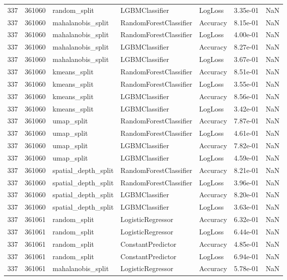 \begin{tabular}{rrlllrr}
337 & 361060 & random\_split & LGBMClassifier & LogLoss & 3.35e-01 & NaN \\
337 & 361060 & mahalanobis\_split & RandomForestClassifier & Accuracy & 8.15e-01 & NaN \\
337 & 361060 & mahalanobis\_split & RandomForestClassifier & LogLoss & 4.00e-01 & NaN \\
337 & 361060 & mahalanobis\_split & LGBMClassifier & Accuracy & 8.27e-01 & NaN \\
337 & 361060 & mahalanobis\_split & LGBMClassifier & LogLoss & 3.67e-01 & NaN \\
337 & 361060 & kmeans\_split & RandomForestClassifier & Accuracy & 8.51e-01 & NaN \\
337 & 361060 & kmeans\_split & RandomForestClassifier & LogLoss & 3.55e-01 & NaN \\
337 & 361060 & kmeans\_split & LGBMClassifier & Accuracy & 8.56e-01 & NaN \\
337 & 361060 & kmeans\_split & LGBMClassifier & LogLoss & 3.42e-01 & NaN \\
337 & 361060 & umap\_split & RandomForestClassifier & Accuracy & 7.87e-01 & NaN \\
337 & 361060 & umap\_split & RandomForestClassifier & LogLoss & 4.61e-01 & NaN \\
337 & 361060 & umap\_split & LGBMClassifier & Accuracy & 7.82e-01 & NaN \\
337 & 361060 & umap\_split & LGBMClassifier & LogLoss & 4.59e-01 & NaN \\
337 & 361060 & spatial\_depth\_split & RandomForestClassifier & Accuracy & 8.21e-01 & NaN \\
337 & 361060 & spatial\_depth\_split & RandomForestClassifier & LogLoss & 3.96e-01 & NaN \\
337 & 361060 & spatial\_depth\_split & LGBMClassifier & Accuracy & 8.20e-01 & NaN \\
337 & 361060 & spatial\_depth\_split & LGBMClassifier & LogLoss & 3.63e-01 & NaN \\
337 & 361061 & random\_split & LogisticRegressor & Accuracy & 6.32e-01 & NaN \\
337 & 361061 & random\_split & LogisticRegressor & LogLoss & 6.44e-01 & NaN \\
337 & 361061 & random\_split & ConstantPredictor & Accuracy & 4.85e-01 & NaN \\
337 & 361061 & random\_split & ConstantPredictor & LogLoss & 6.94e-01 & NaN \\
337 & 361061 & mahalanobis\_split & LogisticRegressor & Accuracy & 5.78e-01 & NaN \\

\end{tabular}
